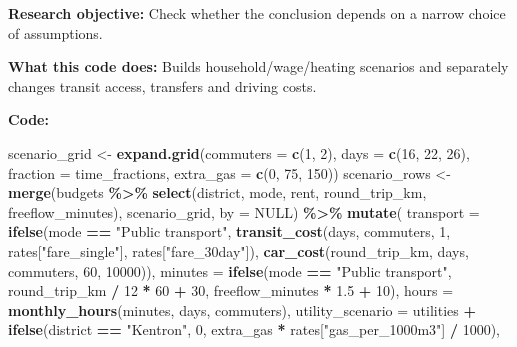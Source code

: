 \documentclass[
]{article}
\newenvironment{Shaded}{\begin{snugshade}}{\end{snugshade}}
\newcommand{\AttributeTok}[1]{\textcolor[rgb]{0.13,0.29,0.53}{#1}}
\newcommand{\ConstantTok}[1]{\textcolor[rgb]{0.56,0.35,0.01}{#1}}
\newcommand{\DecValTok}[1]{\textcolor[rgb]{0.00,0.00,0.81}{#1}}
\newcommand{\FloatTok}[1]{\textcolor[rgb]{0.00,0.00,0.81}{#1}}
\newcommand{\FunctionTok}[1]{\textcolor[rgb]{0.13,0.29,0.53}{\textbf{#1}}}
\newcommand{\NormalTok}[1]{#1}
\newcommand{\OtherTok}[1]{\textcolor[rgb]{0.56,0.35,0.01}{#1}}
\newcommand{\SpecialCharTok}[1]{\textcolor[rgb]{0.81,0.36,0.00}{\textbf{#1}}}
\newcommand{\StringTok}[1]{\textcolor[rgb]{0.31,0.60,0.02}{#1}}
\begin{document}
\textbf{Research objective:} Check whether the conclusion depends on a
narrow choice of assumptions.

\textbf{What this code does:} Builds household/wage/heating scenarios
and separately changes transit access, transfers and driving costs.

\textbf{Code:}

\begin{Shaded}
\begin{Highlighting}[]
\NormalTok{scenario\_grid }\OtherTok{\textless{}{-}} \FunctionTok{expand.grid}\NormalTok{(}\AttributeTok{commuters =} \FunctionTok{c}\NormalTok{(}\DecValTok{1}\NormalTok{, }\DecValTok{2}\NormalTok{), }\AttributeTok{days =} \FunctionTok{c}\NormalTok{(}\DecValTok{16}\NormalTok{, }\DecValTok{22}\NormalTok{, }\DecValTok{26}\NormalTok{),}
  \AttributeTok{fraction =}\NormalTok{ time\_fractions, }\AttributeTok{extra\_gas =} \FunctionTok{c}\NormalTok{(}\DecValTok{0}\NormalTok{, }\DecValTok{75}\NormalTok{, }\DecValTok{150}\NormalTok{))}
\NormalTok{scenario\_rows }\OtherTok{\textless{}{-}} \FunctionTok{merge}\NormalTok{(budgets }\SpecialCharTok{\%\textgreater{}\%} \FunctionTok{select}\NormalTok{(district, mode, rent, round\_trip\_km, freeflow\_minutes),}
\NormalTok{                       scenario\_grid, }\AttributeTok{by =} \ConstantTok{NULL}\NormalTok{) }\SpecialCharTok{\%\textgreater{}\%} \FunctionTok{mutate}\NormalTok{(}
  \AttributeTok{transport =} \FunctionTok{ifelse}\NormalTok{(mode }\SpecialCharTok{==} \StringTok{"Public transport"}\NormalTok{,}
    \FunctionTok{transit\_cost}\NormalTok{(days, commuters, }\DecValTok{1}\NormalTok{, rates[}\StringTok{"fare\_single"}\NormalTok{], rates[}\StringTok{"fare\_30day"}\NormalTok{]),}
    \FunctionTok{car\_cost}\NormalTok{(round\_trip\_km, days, commuters, }\DecValTok{60}\NormalTok{, }\DecValTok{10000}\NormalTok{)),}
  \AttributeTok{minutes =} \FunctionTok{ifelse}\NormalTok{(mode }\SpecialCharTok{==} \StringTok{"Public transport"}\NormalTok{, round\_trip\_km }\SpecialCharTok{/} \DecValTok{12} \SpecialCharTok{*} \DecValTok{60} \SpecialCharTok{+} \DecValTok{30}\NormalTok{, freeflow\_minutes }\SpecialCharTok{*} \FloatTok{1.5} \SpecialCharTok{+} \DecValTok{10}\NormalTok{),}
  \AttributeTok{hours =} \FunctionTok{monthly\_hours}\NormalTok{(minutes, days, commuters),}
  \AttributeTok{utility\_scenario =}\NormalTok{ utilities }\SpecialCharTok{+} \FunctionTok{ifelse}\NormalTok{(district }\SpecialCharTok{==} \StringTok{"Kentron"}\NormalTok{, }\DecValTok{0}\NormalTok{, extra\_gas }\SpecialCharTok{*}\NormalTok{ rates[}\StringTok{"gas\_per\_1000m3"}\NormalTok{] }\SpecialCharTok{/} \DecValTok{1000}\NormalTok{),}

\end{Highlighting}
\end{Shaded}
\end{document}
